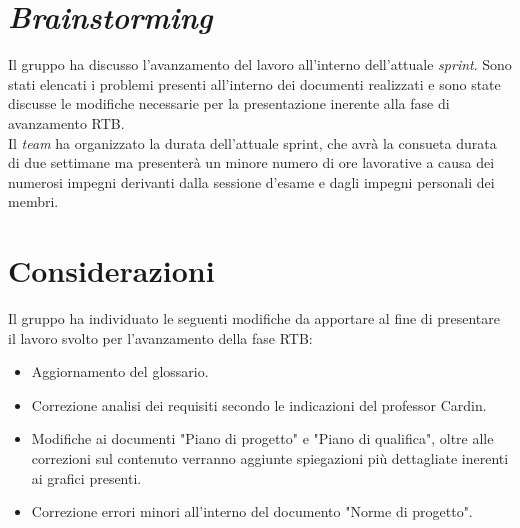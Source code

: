 \section{\textit{Brainstorming}}
Il gruppo ha discusso l'avanzamento del lavoro all'interno dell'attuale \textit{sprint}.
Sono stati elencati i problemi presenti all'interno dei documenti realizzati e sono state discusse le modifiche necessarie per la presentazione inerente alla fase di avanzamento RTB.\\

Il \textit{team} ha organizzato la durata dell'attuale sprint, che avrà la consueta durata di due settimane ma presenterà un minore numero di ore lavorative a causa dei numerosi impegni derivanti dalla sessione d'esame e dagli impegni personali dei membri.

\section{Considerazioni}
Il gruppo ha individuato le seguenti modifiche da apportare al fine di presentare il lavoro svolto per l'avanzamento della fase RTB:
\begin{itemize}
    \item Aggiornamento del glossario.
    \item Correzione analisi dei requisiti secondo le indicazioni del professor Cardin.
    \item Modifiche ai documenti "Piano di progetto" e "Piano di qualifica", oltre alle correzioni sul contenuto verranno aggiunte spiegazioni più dettagliate inerenti ai grafici presenti.
    \item Correzione errori minori all'interno del documento "Norme di progetto".
\end{itemize}